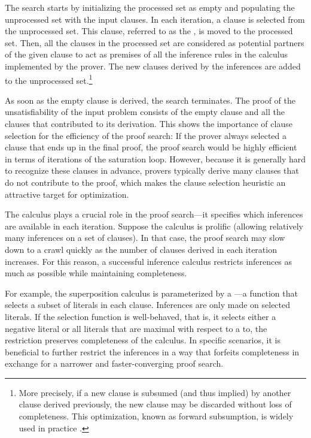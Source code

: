 The search starts by initializing the processed set as empty and populating the unprocessed set with the input clauses.
In each iteration,
a clause is selected from the unprocessed set.
This clause, referred to as the , is moved to the processed set.
Then, all the clauses in the processed set are considered as potential partners of the given clause
to act as premises of all the inference rules in the calculus implemented by the prover.
The new clauses derived by the inferences are added to the unprocessed set.\footnote{More precisely, if a new clause is subsumed (and thus implied) by another clause derived previously, the new clause may be discarded without loss of completeness. This optimization, known as forward subsumption, is widely used in practice \cite{DBLP:journals/corr/cs-SC-0310056,DBLP:journals/jar/Voronkov95,DBLP:books/daglib/0022394}.}

As soon as the empty clause is derived, the search terminates.
The proof of the unsatisfiability of the input problem consists of the empty clause and all the clauses that contributed to its derivation.
This shows the importance of clause selection for the efficiency of the proof search:
If the prover always selected a clause that ends up in the final proof,
the proof search would be highly efficient in terms of iterations of the saturation loop.
However, because it is generally hard to recognize these clauses in advance, provers typically derive many clauses that do not contribute to the proof,
which makes the clause selection heuristic an attractive target for optimization.

The calculus plays a crucial role in the proof search---it specifies which inferences are available in each iteration.
Suppose the calculus is prolific (allowing relatively many inferences on a set of clauses).
In that case, the proof search may slow down to a crawl quickly as the number of clauses derived in each iteration increases.
For this reason, a successful inference calculus restricts inferences as much as possible while maintaining completeness.

For example, the superposition calculus \cite{DBLP:journals/logcom/BachmairG94}
is parameterized by a ---a function that selects a subset of literals in each clause.
Inferences are only made on selected literals.
If the selection function is well-behaved,
that is, it selects either a negative literal or all literals that are maximal with respect to a \gls{to},
the restriction preserves completeness of the calculus.
In specific scenarios, it is beneficial to further restrict the inferences in a way that forfeits completeness
in exchange for a narrower and faster-converging proof search.

